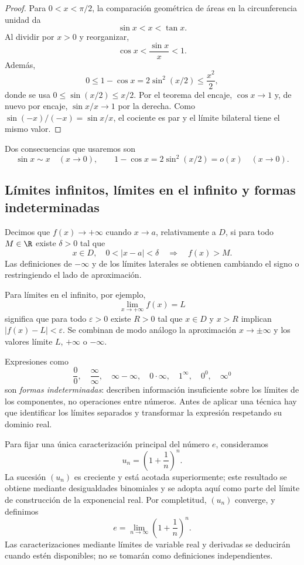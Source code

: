 \begin{proof}
Para \(0<x<\pi/2\), la comparación geométrica de áreas en la circunferencia
unidad da
\[
  \sin x<x<\tan x.
\]
Al dividir por \(x>0\) y reorganizar,
\[
  \cos x<\frac{\sin x}{x}<1.
\]
Además,
\[
  0\le1-\cos x=2\sin^2(x/2)\le\frac{x^2}{2},
\]
donde se usa \(0\le\sin(x/2)\le x/2\). Por el teorema del encaje,
\(\cos x\to1\) y, de nuevo por encaje, \(\sin x/x\to1\) por la derecha.
Como \(\sin(-x)/(-x)=\sin x/x\), el cociente es par y el límite bilateral
tiene el mismo valor.
\end{proof}

Dos consecuencias que usaremos son
\[
  \sin x\sim x \quad(x\to0),
  \qquad
  1-\cos x=2\sin^2(x/2)=o(x) \quad(x\to0).
\]

\subsection{Límites infinitos, límites en el infinito y formas indeterminadas}

Decimos que \(f(x)\to+\infty\) cuando \(x\to a\), relativamente a \(D\),
si para todo \(M\in\R\) existe \(\delta>0\) tal que
\[
 x\in D,\quad 0<|x-a|<\delta
 \quad\Longrightarrow\quad f(x)>M.
\]
Las definiciones de \(-\infty\) y de los límites laterales se obtienen
cambiando el signo o restringiendo el lado de aproximación.

Para límites en el infinito, por ejemplo,
\[
  \lim_{x\to+\infty}f(x)=L
\]
significa que para todo \(\varepsilon>0\) existe \(R>0\) tal que
\(x\in D\) y \(x>R\) implican \(|f(x)-L|<\varepsilon\). Se combinan de modo
análogo la aproximación \(x\to\pm\infty\) y los valores límite
\(L\), \(+\infty\) o \(-\infty\).

Expresiones como
\[
 \frac00,\quad \frac\infty\infty,\quad
 \infty-\infty,\quad 0\cdot\infty,
 \quad 1^\infty,\quad0^0,\quad\infty^0
\]
son \emph{formas indeterminadas}: describen información insuficiente sobre
los límites de los componentes, no operaciones entre números. Antes de aplicar
una técnica hay que identificar los límites separados y transformar la
expresión respetando su dominio real.

Para fijar una única caracterización principal del número \(e\), consideramos
\[
  u_n=\left(1+\frac1n\right)^n.
\]
La sucesión \((u_n)\) es creciente y está acotada superiormente; este resultado
se obtiene mediante desigualdades binomiales y se adopta aquí como parte del
límite de construcción de la exponencial real. Por completitud, \((u_n)\)
converge, y definimos
\[
  e=\lim_{n\to\infty}\left(1+\frac1n\right)^n.
\]
Las caracterizaciones mediante límites de variable real y derivadas se
deducirán cuando estén disponibles; no se tomarán como definiciones
independientes.

